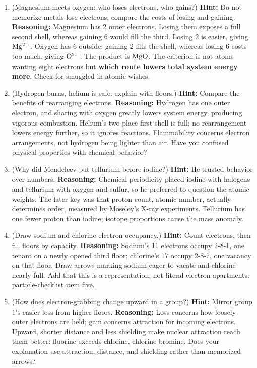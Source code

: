 \begin{enumerate}[itemsep=3pt]
\item (Magnesium meets oxygen: who loses electrons, who gains?) \textbf{Hint:} Do not memorize metals lose electrons; compare the costs of losing and gaining. \textbf{Reasoning:} Magnesium has 2 outer electrons. Losing them exposes a full second shell, whereas gaining 6 would fill the third. Losing 2 is easier, giving $\mathrm{Mg^{2+}}$. Oxygen has 6 outside; gaining 2 fills the shell, whereas losing 6 costs too much, giving $\mathrm{O^{2-}}$. The product is $\mathrm{MgO}$. The criterion is not atoms wanting eight electrons but \textbf{which route lowers total system energy more}. Check for smuggled-in atomic wishes.
\item (Hydrogen burns, helium is safe: explain with floors.) \textbf{Hint:} Compare the benefits of rearranging electrons. \textbf{Reasoning:} Hydrogen has one outer electron, and sharing with oxygen greatly lowers system energy, producing vigorous combustion. Helium's two-place first shell is full; no rearrangement lowers energy further, so it ignores reactions. Flammability concerns electron arrangements, not hydrogen being lighter than air. Have you confused physical properties with chemical behavior?
\item (Why did Mendeleev put tellurium before iodine?) \textbf{Hint:} He trusted behavior over numbers. \textbf{Reasoning:} Chemical periodicity placed iodine with halogens and tellurium with oxygen and sulfur, so he preferred to question the atomic weights. The later key was that proton count, atomic number, actually determines order, measured by Moseley's X-ray experiments. Tellurium has one fewer proton than iodine; isotope proportions cause the mass anomaly.
\item (Draw sodium and chlorine electron occupancy.) \textbf{Hint:} Count electrons, then fill floors by capacity. \textbf{Reasoning:} Sodium's 11 electrons occupy 2-8-1, one tenant on a newly opened third floor; chlorine's 17 occupy 2-8-7, one vacancy on that floor. Draw arrows marking sodium eager to vacate and chlorine nearly full. Add that this is a representation, not literal electron apartments: particle-checklist item five.
\item (How does electron-grabbing change upward in a group?) \textbf{Hint:} Mirror group 1's easier loss from higher floors. \textbf{Reasoning:} Loss concerns how loosely outer electrons are held; gain concerns attraction for incoming electrons. Upward, shorter distance and less shielding make nuclear attraction reach them better: fluorine exceeds chlorine, chlorine bromine. Does your explanation use attraction, distance, and shielding rather than memorized arrows?
\end{enumerate}

